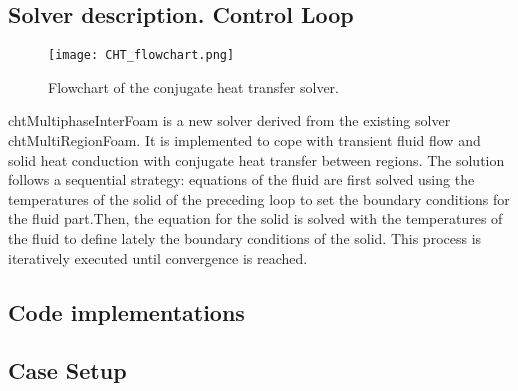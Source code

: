 \subsection{Solver description. Control Loop}
\begin{figure}[h!]
	\centering
	\texttt{[image: CHT\_flowchart.png]}	
	\label{4.1fig}
	\caption{Flowchart of the conjugate heat transfer solver.\cite{sugimoto_kuramae_matsumoto_watanabe_2021}}
\end{figure} 
chtMultiphaseInterFoam is a new solver derived from the existing solver chtMultiRegionFoam. It is implemented to cope with transient fluid flow and solid heat conduction with conjugate heat transfer between regions.
The solution follows a sequential strategy: equations of the fluid are first solved using the temperatures of the solid of the preceding loop to set the boundary conditions for the fluid part.Then, the equation for the solid is solved with the temperatures of the fluid to define lately the boundary conditions of the solid. This process is iteratively executed until convergence is reached.

\subsection{Code implementations}
\subsection{Case Setup}
